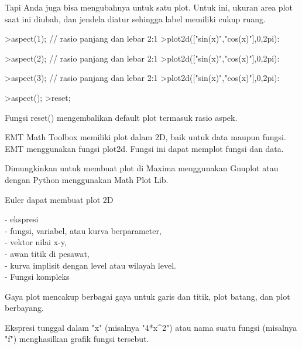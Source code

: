 \documentclass[a4paper,10pt]{article}
\begin{document}
\begin{eulernotebook}
\begin{eulercomment}
Tapi Anda juga bisa mengubahnya untuk satu plot. Untuk ini, ukuran
area plot saat ini diubah, dan jendela diatur sehingga label memiliki
cukup ruang.
\end{eulercomment}
\begin{eulerprompt}
>aspect(1); // rasio panjang dan lebar 2:1
>plot2d(["sin(x)","cos(x)"],0,2pi):
\end{eulerprompt}
\begin{eulerprompt}
>aspect(2); // rasio panjang dan lebar 2:1
>plot2d(["sin(x)","cos(x)"],0,2pi):
\end{eulerprompt}
\begin{eulerprompt}
>aspect(3); // rasio panjang dan lebar 2:1
>plot2d(["sin(x)","cos(x)"],0,2pi):
\end{eulerprompt}
\begin{eulerprompt}
>aspect();
>reset;
\end{eulerprompt}
\begin{eulercomment}
Fungsi reset() mengembalikan default plot termasuk rasio aspek.\\
\begin{eulercomment}
\begin{eulercomment}
EMT Math Toolbox memiliki plot dalam 2D, baik untuk data maupun
fungsi. EMT menggunakan fungsi plot2d. Fungsi ini dapat memplot fungsi
dan data.

Dimungkinkan untuk membuat plot di Maxima menggunakan Gnuplot atau
dengan Python menggunakan Math Plot Lib.

Euler dapat membuat plot 2D

- ekspresi\\
- fungsi, variabel, atau kurva berparameter,\\
- vektor nilai x-y,\\
- awan titik di pesawat,\\
- kurva implisit dengan level atau wilayah level.\\
- Fungsi kompleks

Gaya plot mencakup berbagai gaya untuk garis dan titik, plot batang,
dan plot berbayang.\\
\begin{eulercomment}
\begin{eulercomment}
Ekspresi tunggal dalam "x" (misalnya "4*x\textasciicircum{}2") atau nama suatu fungsi
(misalnya "f") menghasilkan grafik fungsi tersebut.


\end{eulercomment}
\end{eulercomment}
\end{eulercomment}
\end{eulercomment}
\end{eulercomment}
\end{eulernotebook}
\end{document}
